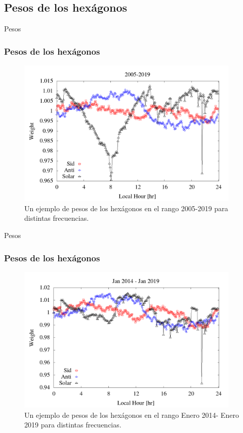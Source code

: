 \documentclass{beamer}
\begin{document}
\subsection{Pesos de los hexágonos}

\begin{frame}{Pesos}
\frametitle{Pesos de los hexágonos}

\begin{figure}[htbp]
  \centering
  \includegraphics[width=0.95\textwidth]{./../../Cpp/Anisotropy/report_2_27_04_2020/weigth2005-2019.png}
  \caption{Un ejemplo de pesos de los hexágonos en el rango 2005-2019 para distintas frecuencias.}
\end{figure}

\end{frame}

\begin{frame}{Pesos}
\frametitle{Pesos de los hexágonos}

\begin{figure}[htbp]
  \centering
  \includegraphics[width=0.95\textwidth]{./../../Plotting/weigth2014-2019_jan.png}
  \caption{Un ejemplo de pesos de los hexágonos en el rango Enero 2014- Enero 2019 para distintas frecuencias.}
\end{figure}

\end{frame}
\end{document}
